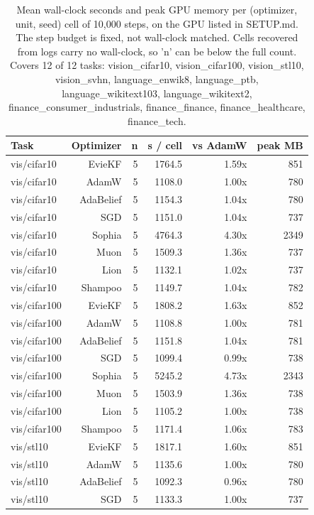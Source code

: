 \begin{table}[t]
\centering
\small
\caption{Mean wall-clock seconds and peak GPU memory per (optimizer, unit, seed) cell of 10,000 steps, on the GPU listed in SETUP.md. The step budget is fixed, not wall-clock matched. Cells recovered from logs carry no wall-clock, so 'n' can be below the full count. Covers 12 of 12 tasks: vision\_cifar10, vision\_cifar100, vision\_stl10, vision\_svhn, language\_enwik8, language\_ptb, language\_wikitext103, language\_wikitext2, finance\_consumer\_industrials, finance\_finance, finance\_healthcare, finance\_tech.}
\label{tab:table8_compute}
\begin{tabular}{lrrrrr}
\toprule
Task & Optimizer & n & s / cell & vs AdamW & peak MB \\
\midrule
vis/cifar10 & EvieKF & 5 & 1764.5 & 1.59x & 851 \\
vis/cifar10 & AdamW & 5 & 1108.0 & 1.00x & 780 \\
vis/cifar10 & AdaBelief & 5 & 1154.3 & 1.04x & 780 \\
vis/cifar10 & SGD & 5 & 1151.0 & 1.04x & 737 \\
vis/cifar10 & Sophia & 5 & 4764.3 & 4.30x & 2349 \\
vis/cifar10 & Muon & 5 & 1509.3 & 1.36x & 737 \\
vis/cifar10 & Lion & 5 & 1132.1 & 1.02x & 737 \\
vis/cifar10 & Shampoo & 5 & 1149.7 & 1.04x & 782 \\
vis/cifar100 & EvieKF & 5 & 1808.2 & 1.63x & 852 \\
vis/cifar100 & AdamW & 5 & 1108.8 & 1.00x & 781 \\
vis/cifar100 & AdaBelief & 5 & 1151.8 & 1.04x & 781 \\
vis/cifar100 & SGD & 5 & 1099.4 & 0.99x & 738 \\
vis/cifar100 & Sophia & 5 & 5245.2 & 4.73x & 2343 \\
vis/cifar100 & Muon & 5 & 1503.9 & 1.36x & 738 \\
vis/cifar100 & Lion & 5 & 1105.2 & 1.00x & 738 \\
vis/cifar100 & Shampoo & 5 & 1171.4 & 1.06x & 783 \\
vis/stl10 & EvieKF & 5 & 1817.1 & 1.60x & 851 \\
vis/stl10 & AdamW & 5 & 1135.6 & 1.00x & 780 \\
vis/stl10 & AdaBelief & 5 & 1092.3 & 0.96x & 780 \\
vis/stl10 & SGD & 5 & 1133.3 & 1.00x & 737 \\

\end{tabular}
\end{table}
